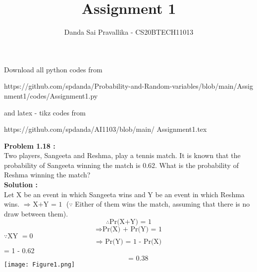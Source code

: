 \documentclass[journal,12pt,twocolumn]{IEEEtran}
\title{Assignment 1}
\author{Danda Sai Pravallika  - CS20BTECH11013}
\begin{document}
\maketitle
Download all python codes from
\begin{tcolorbox}
https://github.com/spdanda/Probability-and-Random-variables/blob/main/Assig
nment1/codes/Assignment1.py
\end{tcolorbox}
and latex - tikz codes from 
\begin{tcolorbox}
https://github.com/spdanda/AI1103/blob/main/
Assignment1.tex
\end{tcolorbox}

\large\textbf{Problem 1.18 :}
\\Two  players,  Sangeeta  and  Reshma,  play  a tennis  match.  It  is  known  that  the  probability of Sangeeta winning the match is 0.62. What is the probability of Reshma winning the match?
\\\textbf{Solution :}
\\ Let X be an event in which Sangeeta wins and Y be an event in which Reshma wins.
\(\Rightarrow \text{ X+Y = 1} \) (\(\because\) Either of them wins the match, assuming that there is no draw between them). \[\therefore \text{Pr(X+Y) = 1}\]
\[\Rightarrow \text{Pr(X) + Pr(Y) = 1}\]
\hspace{4cm}\(\because \text{XY }= 0\)
\[\Rightarrow \text{ Pr(Y) = 1 - Pr(X)}\]
\hspace{119pt} = 1 - 0.62
\[ \hspace{33pt} \text{= 0.38}\]
\newpage
\centering\texttt{[image: Figure1.png]}
\end{document}
